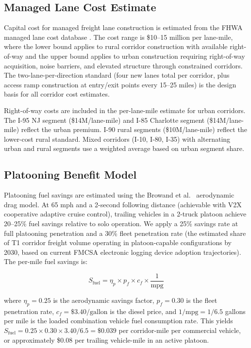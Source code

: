 \subsection{Managed Lane Cost Estimate}

Capital cost for managed freight lane construction is estimated from the FHWA managed lane cost database \citep{FHWA_ML2021}. The cost range is \$10--15 million per lane-mile, where the lower bound applies to rural corridor construction with available right-of-way and the upper bound applies to urban construction requiring right-of-way acquisition, noise barriers, and elevated structure through constrained corridors. The two-lane-per-direction standard (four new lanes total per corridor, plus access ramp construction at entry/exit points every 15--25 miles) is the design basis for all corridor cost estimates.

Right-of-way costs are included in the per-lane-mile estimate for urban corridors. The I-95 NJ segment (\$14M/lane-mile) and I-85 Charlotte segment (\$14M/lane-mile) reflect the urban premium. I-90 rural segments (\$10M/lane-mile) reflect the lower-cost rural standard. Mixed corridors (I-10, I-80, I-35) with alternating urban and rural segments use a weighted average based on urban segment share.

\subsection{Platooning Benefit Model}

Platooning fuel savings are estimated using the Browand et al.\ \citep{Browand2004} aerodynamic drag model. At 65 mph and a 2-second following distance (achievable with V2X cooperative adaptive cruise control), trailing vehicles in a 2-truck platoon achieve 20--25\% fuel savings relative to solo operation. We apply a 25\% savings rate at full platooning penetration and a 30\% fleet penetration rate (the estimated share of T1 corridor freight volume operating in platoon-capable configurations by 2030, based on current FMCSA electronic logging device adoption trajectories). The per-mile fuel savings is:

\begin{equation}
S_{\text{fuel}} = \eta_p \times p_f \times c_f \times \frac{1}{\text{mpg}}
\label{eq:platooning}
\end{equation}

where $\eta_p = 0.25$ is the aerodynamic savings factor, $p_f = 0.30$ is the fleet penetration rate, $c_f = \$3.40/\text{gallon}$ is the diesel price, and $1/\text{mpg} = 1/6.5$ gallons per mile is the loaded combination vehicle fuel consumption rate. This yields $S_{\text{fuel}} = 0.25 \times 0.30 \times 3.40 / 6.5 = \$0.039$ per corridor-mile per commercial vehicle, or approximately \$0.08 per trailing vehicle-mile in an active platoon.
